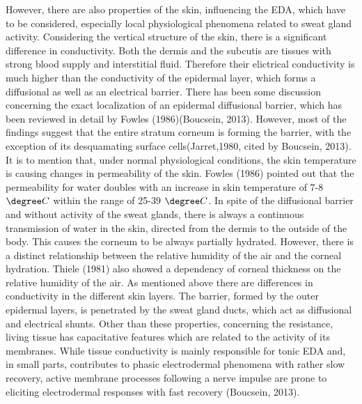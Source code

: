 However, there are also properties of the skin, influencing the EDA, which have to be considered, especially local physiological phenomena related to sweat gland activity. Considering the vertical structure of the skin, there is a significant difference in conductivity. Both the dermis and the subcutis are tissues with strong blood supply and interstitial fluid. Therefore their elictrical conductivity is much higher than the conductivity of the epidermal layer, which forms a diffusional as well as an electrical barrier. There has been some discussion concerning the exact localization of an epidermal diffusional barrier, which has been reviewed in detail by Fowles (1986)(Boucsein, 2013). However, most of the findings suggest that the entire stratum corneum is forming the barrier, with the exception of its desquamating surface cells(Jarret,1980, cited by Boucsein, 2013). 
It is to mention that, under normal physiological conditions, the skin temperature is causing changes in permeability of the skin. Fowles (1986) pointed out that the permeability for water doubles with an increase in skin temperature of 7-8 $\degree C$ within the range of 25-39 $\degree C$. In spite of the diffusional barrier and without activity of the sweat glands, there is always a continuous transmission of water in the skin, directed from the dermis to the outside of the body. This causes the corneum to be always partially hydrated. However, there is a distinct relationship between the relative humidity of the air and the corneal hydration.
Thiele (1981) also showed a dependency of corneal thickness on the relative humidity of the air. As mentioned above there are differences in conductivity in the different skin layers. The barrier, formed by the outer epidermal layers, is penetrated by the sweat gland ducts, which act as diffusional and electrical shunts.
Other than these properties, concerning the resistance, living tissue has capacitative features which are related to the activity of its membranes. While tissue conductivity is mainly responsible for tonic EDA and, in small parts, contributes to phasic electrodermal phenomena with rather slow recovery, active membrane processes following a nerve impulse are prone to eliciting electrodermal responses with fast recovery (Boucsein, 2013).

